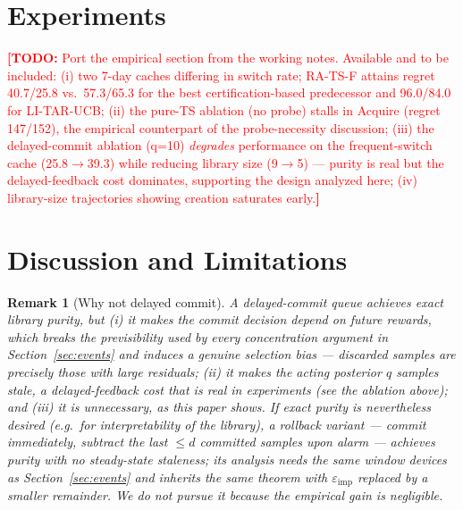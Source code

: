 \documentclass[11pt]{article}
\newtheorem{remark}{Remark}
\newcommand{\eimp}{\varepsilon_{\mathrm{imp}}}
\newcommand{\todo}[1]{\textcolor{red}{\textbf{[TODO:} #1\textbf{]}}}
\begin{document}
\section{Experiments}

\todo{Port the empirical section from the working notes. Available and to be included: (i) two 7-day caches differing in switch rate; RA-TS-F attains regret 40.7/25.8 vs.\ 57.3/65.3 for the best certification-based predecessor and 96.0/84.0 for LI-TAR-UCB; (ii) the pure-TS ablation (no probe) stalls in Acquire (regret 147/152), the empirical counterpart of the probe-necessity discussion; (iii) the delayed-commit ablation (q=10) \emph{degrades} performance on the frequent-switch cache (25.8$\to$39.3) while reducing library size (9$\to$5) --- purity is real but the delayed-feedback cost dominates, supporting the design analyzed here; (iv) library-size trajectories showing creation saturates early.}

\section{Discussion and Limitations}
\label{sec:discussion}

\begin{remark}[Why not delayed commit]
\label{rem:no_queue}
A delayed-commit queue achieves exact library purity, but (i) it makes the commit decision depend on future rewards, which breaks the previsibility used by every concentration argument in Section~\ref{sec:events} and induces a genuine selection bias --- discarded samples are precisely those with large residuals; (ii) it makes the acting posterior $q$ samples stale, a delayed-feedback cost \citep{JoulaniGyorgySzepesvari2013} that is real in experiments (see the ablation above); and (iii) it is unnecessary, as this paper shows. If exact purity is nevertheless desired (e.g.\ for interpretability of the library), a \emph{rollback} variant --- commit immediately, subtract the last $\le d$ committed samples upon alarm --- achieves purity with no steady-state staleness; its analysis needs the same window devices as Section~\ref{sec:events} and inherits the same theorem with $\eimp$ replaced by a smaller remainder. We do not pursue it because the empirical gain is negligible.
\end{remark}
\end{document}
